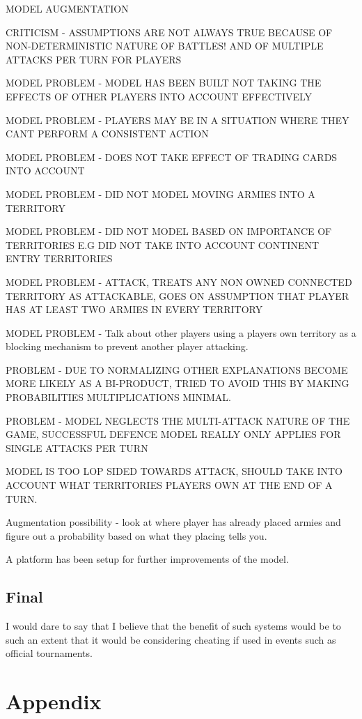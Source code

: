 \documentclass[parskip]{cs4rep}
\begin{document}
MODEL AUGMENTATION

CRITICISM - ASSUMPTIONS ARE NOT ALWAYS TRUE BECAUSE OF NON-DETERMINISTIC NATURE OF BATTLES! AND OF MULTIPLE ATTACKS PER TURN FOR PLAYERS

MODEL PROBLEM - MODEL HAS BEEN BUILT NOT TAKING THE EFFECTS OF OTHER PLAYERS INTO ACCOUNT EFFECTIVELY

MODEL PROBLEM - PLAYERS MAY BE IN A SITUATION WHERE THEY CANT PERFORM A CONSISTENT ACTION

MODEL PROBLEM - DOES NOT TAKE EFFECT OF TRADING CARDS INTO ACCOUNT

MODEL PROBLEM - DID NOT MODEL MOVING ARMIES INTO A TERRITORY

MODEL PROBLEM - DID NOT MODEL BASED ON IMPORTANCE OF TERRITORIES E.G DID NOT TAKE INTO ACCOUNT CONTINENT ENTRY TERRITORIES

MODEL PROBLEM - ATTACK, TREATS ANY NON OWNED CONNECTED TERRITORY AS ATTACKABLE, GOES ON ASSUMPTION THAT PLAYER HAS AT LEAST TWO ARMIES IN EVERY TERRITORY

MODEL PROBLEM - Talk about other players using a players own territory as a blocking mechanism to prevent another player attacking.

PROBLEM - DUE TO NORMALIZING OTHER EXPLANATIONS BECOME MORE LIKELY AS A BI-PRODUCT, TRIED TO AVOID THIS BY MAKING PROBABILITIES MULTIPLICATIONS MINIMAL.

PROBLEM - MODEL NEGLECTS THE MULTI-ATTACK NATURE OF THE GAME, SUCCESSFUL DEFENCE MODEL REALLY ONLY APPLIES FOR SINGLE ATTACKS PER TURN

MODEL IS TOO LOP SIDED TOWARDS ATTACK, SHOULD TAKE INTO ACCOUNT WHAT TERRITORIES PLAYERS OWN AT THE END OF A TURN.

Augmentation possibility - look at where player has already placed armies and figure out a probability based on what they placing tells you.

A platform has been setup for further improvements of the model.

\section{Final}

I would dare to say that I believe that the benefit of such systems would be to such an extent that it would be considering cheating if used in events such as official tournaments.

\chapter{Appendix}
\end{document}
